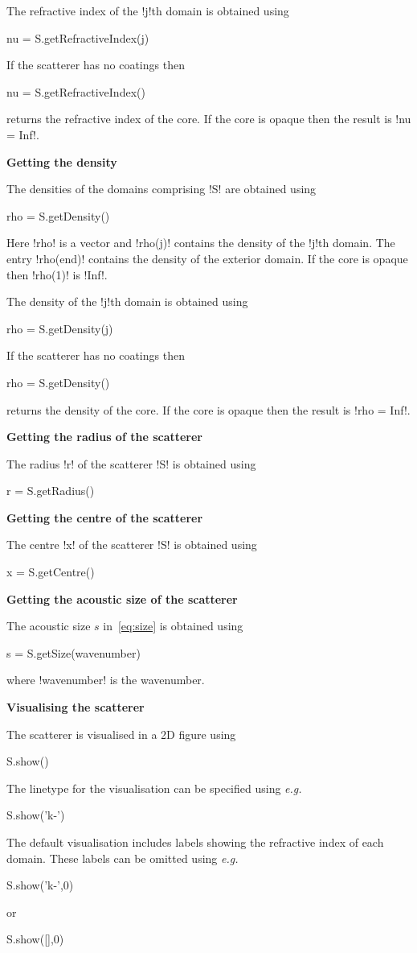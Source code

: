 \documentclass[11pt,letterpaper]{article}
\newcommand{\eg}{{\em e.g.}}
\newcommand{\techheading}[1]{%
    \par\vspace{-0.3\parskip}\noindent\hspace{-1cm}\textbf{#1}%
    \par\vspace{-0.5\parskip}\noindent\nopagebreak\ignorespaces}
\begin{document}
The refractive index of the !j!th domain is obtained using
\begin{matlab}
nu = S.getRefractiveIndex(j)
\end{matlab}
If the scatterer has no coatings then
\begin{matlab}
nu = S.getRefractiveIndex()
\end{matlab}
returns the refractive index of the core.
If the core is opaque then the result is !nu = Inf!.

\techheading{Getting the density}
The densities of the domains comprising !S! are obtained
using
\begin{matlab}
rho = S.getDensity()
\end{matlab}
Here !rho! is a vector and !rho(j)! contains the density of
the !j!th domain.
The entry !rho(end)! contains the density of the exterior domain.
If the core is opaque then !rho(1)! is !Inf!.

The density of the !j!th domain is obtained using
\begin{matlab}
rho = S.getDensity(j)
\end{matlab}
If the scatterer has no coatings then
\begin{matlab}
rho = S.getDensity()
\end{matlab}
returns the density of the core.
If the core is opaque then the result is !rho = Inf!.

\techheading{Getting the radius of the scatterer}
The radius !r! of the scatterer !S! is obtained using
\begin{matlab}
r = S.getRadius()
\end{matlab}

\techheading{Getting the centre of the scatterer}
The centre !x! of the scatterer !S! is obtained using
\begin{matlab}
x = S.getCentre()
\end{matlab}

\techheading{Getting the acoustic size of the scatterer}
The acoustic size $s$ in~\eqref{eq:size} is obtained using
\begin{matlab}
s = S.getSize(wavenumber)
\end{matlab}
where !wavenumber! is the wavenumber.

\techheading{Visualising the scatterer}
The scatterer is visualised in a 2D figure using
\begin{matlab}
S.show()
\end{matlab}
The linetype for the visualisation can be specified using \eg{}
\begin{matlab}
S.show('k-')
\end{matlab}
The default visualisation includes labels showing the refractive index
of each domain. These labels can be omitted using \eg{}
\begin{matlab}
S.show('k-',0)
\end{matlab}
or
\begin{matlab}
S.show([],0)
\end{matlab}
\end{document}
